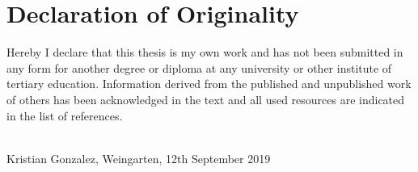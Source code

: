 \vspace*{1.5cm}
\section*{Declaration of Originality}
Hereby I declare that this thesis is my own work and has not been submitted in any form for another degree or diploma at any university or other institute of tertiary education. Information derived from the published and unpublished work of others has been acknowledged in the text and all used resources are indicated in the list of references.

\vspace{1cm}

\underline{\hspace{5cm}}\\

Kristian Gonzalez, Weingarten, 12th September 2019

